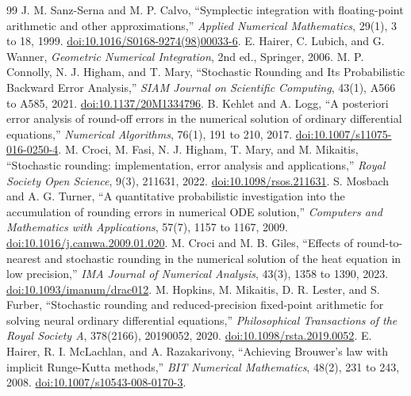 \documentclass[
11pt
]{article}
\begin{document}
\clearpage
\begin{thebibliography}{99}
\small
{}
  J. M. Sanz-Serna and M. P. Calvo, ``Symplectic integration with
  floating-point arithmetic and other approximations,'' \emph{Applied
  Numerical Mathematics}, 29(1), 3 to 18, 1999.
  \href{https://doi.org/10.1016/S0168-9274(98)00033-6}{doi:10.1016/S0168-9274(98)00033-6}.
  E. Hairer, C. Lubich, and G. Wanner, \emph{Geometric Numerical
  Integration}, 2nd ed., Springer, 2006.
  M. P. Connolly, N. J. Higham, and T. Mary, ``Stochastic Rounding and
  Its Probabilistic Backward Error Analysis,'' \emph{SIAM Journal on
  Scientific Computing}, 43(1), A566 to A585, 2021.
  \href{https://doi.org/10.1137/20M1334796}{doi:10.1137/20M1334796}.
  B. Kehlet and A. Logg, ``A posteriori error analysis of round-off
  errors in the numerical solution of ordinary differential equations,''
  \emph{Numerical Algorithms}, 76(1), 191 to 210, 2017.
  \href{https://doi.org/10.1007/s11075-016-0250-4}{doi:10.1007/s11075-016-0250-4}.
  M. Croci, M. Fasi, N. J. Higham, T. Mary, and M. Mikaitis, ``Stochastic
  rounding: implementation, error analysis and applications,'' \emph{Royal
  Society Open Science}, 9(3), 211631, 2022.
  \href{https://doi.org/10.1098/rsos.211631}{doi:10.1098/rsos.211631}.
  S. Mosbach and A. G. Turner, ``A quantitative probabilistic investigation
  into the accumulation of rounding errors in numerical ODE solution,''
  \emph{Computers and Mathematics with Applications}, 57(7), 1157 to 1167, 2009.
  \href{https://doi.org/10.1016/j.camwa.2009.01.020}{doi:10.1016/j.camwa.2009.01.020}.
  M. Croci and M. B. Giles, ``Effects of round-to-nearest and stochastic
  rounding in the numerical solution of the heat equation in low precision,''
  \emph{IMA Journal of Numerical Analysis}, 43(3), 1358 to 1390, 2023.
  \href{https://doi.org/10.1093/imanum/drac012}{doi:10.1093/imanum/drac012}.
  M. Hopkins, M. Mikaitis, D. R. Lester, and S. Furber, ``Stochastic rounding
  and reduced-precision fixed-point arithmetic for solving neural ordinary
  differential equations,'' \emph{Philosophical Transactions of the Royal
  Society A}, 378(2166), 20190052, 2020.
  \href{https://doi.org/10.1098/rsta.2019.0052}{doi:10.1098/rsta.2019.0052}.
  E. Hairer, R. I. McLachlan, and A. Razakarivony, ``Achieving Brouwer's
  law with implicit Runge-Kutta methods,'' \emph{BIT Numerical
  Mathematics}, 48(2), 231 to 243, 2008.
  \href{https://doi.org/10.1007/s10543-008-0170-3}{doi:10.1007/s10543-008-0170-3}.
\end{thebibliography}
\end{document}
